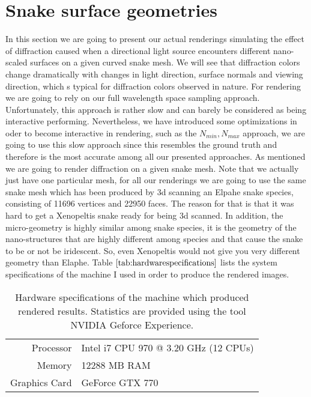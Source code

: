 \section{Snake surface geometries}
\label{sec:snakegeomrenderings}
In this section we are going to present our actual renderings simulating the effect of diffraction caused when a directional light source encounters different nano-scaled surfaces on a given curved snake mesh. We will see that diffraction colors change dramatically with changes in light direction, surface normals and viewing direction, which s typical for diffraction colors observed in nature. For rendering we are going to rely on our full wavelength space sampling approach. Unfortunately, this approach is rather slow and can barely be considered as being interactive performing. Nevertheless, we have introduced some optimizations in oder to become interactive in rendering, such as the $N_{min}, N_{max}$ approach, we are going to use this slow approach since this resembles the ground truth and therefore is the most accurate among all our presented approaches. As mentioned we are going to render diffraction on a given snake mesh. Note that we actually just have one particular mesh, for all our renderings we are going to use the same snake mesh which has been produced by 3d scanning an Elpahe snake species, consisting of 11696 vertices and 22950 faces. The reason for that is that it was hard to get a Xenopeltis snake ready for being 3d scanned. In addition, the micro-geometry is highly similar among snake species, it is the geometry of the nano-structures that are highly different among species and that cause the snake to be or not be iridescent. So, even Xenopeltis would not give you very different geometry than Elaphe. Table $\ref{tab:hardwarespecifications}$ lists the system specifications of the machine I used in order to produce the rendered images.

\begin{table}[H]
  \centering
  \begin{tabular}{|r|l|}
    \hline
    Processor & Intel i7 CPU 970 @ 3.20 GHz (12 CPUs) \\
    Memory & 12288 MB RAM \\
    Graphics Card & GeForce GTX 770 \\
    \hline  
  \end{tabular}
\caption{Hardware specifications of the machine which produced rendered results. Statistics are provided using the tool NVIDIA Geforce Experience.}
\label{tab:hardwarespecifications}
\end{table}

